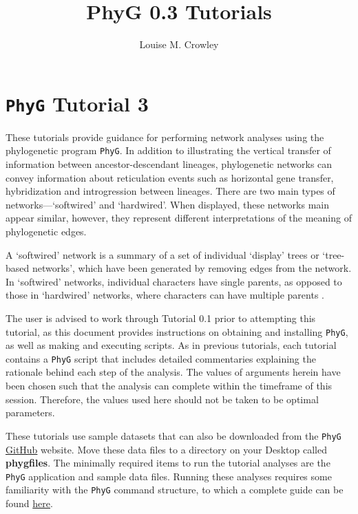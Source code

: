 \documentclass[11pt]{article}
\title{PhyG 0.3 Tutorials}
\author{Louise M. Crowley}
\newcommand{\phyg}{\texttt{PhyG} }
\begin{document}
\maketitle

\section{\phyg Tutorial 3}

These tutorials provide guidance for performing network analyses using the 
phylogenetic program \texttt{PhyG}. In addition to illustrating the vertical transfer 
of information between ancestor-descendant lineages, phylogenetic networks 
can convey information about reticulation events such as horizontal gene transfer, 
hybridization and introgression between lineages. There are two main types of 
networks---`softwired' and `hardwired'. When displayed, these networks main 
appear similar, however, they represent different interpretations of the meaning 
of phylogenetic edges.

A `softwired' network is a summary of a set of individual `display' trees or `tree-based 
networks', which have been generated by removing edges from the network.
In `softwired' networks, individual characters have single parents, as opposed 
to those in `hardwired' networks, where characters can have multiple parents 
\citep{KannanandWheeler2012}.

The user is advised to work through Tutorial 0.1 prior to attempting this tutorial, 
as this document provides instructions on obtaining and installing \texttt{PhyG}, 
as well as making and executing scripts. As in previous tutorials, each tutorial 
contains a \phyg script that includes detailed commentaries explaining the 
rationale behind each step of the analysis. The values of arguments herein have 
been chosen such that the analysis can complete within the timeframe of this 
session. Therefore, the values used here should not be taken to be optimal 
parameters. 

These tutorials use sample datasets that can also be downloaded from the 
\texttt{PhyG} \href{https://github.com/amnh/PhyGraph}{GitHub} website. Move 
these data files to a directory on your Desktop called \textbf{phygfiles}. The 
minimally required items to run the tutorial analyses are the \phyg application 
and sample data files. Running these analyses requires some familiarity with 
the \phyg command structure, to which a complete guide can be found 
\href{https://github.com/amnh/PhyGraph}{here}.
\end{document}
